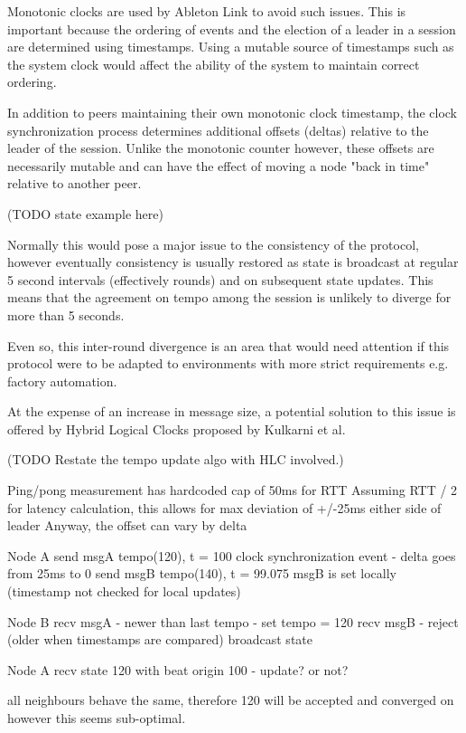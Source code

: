 \documentclass[11pt]{article} %
\theoremstyle{plain}
\theoremstyle{definition}
\begin{document}
Monotonic clocks are used by Ableton Link\cite{goltz2018ableton} to avoid such
issues. This is important because the ordering of events and the election of a
leader in a session are determined using timestamps. Using a mutable source of
timestamps such as the system clock would affect the ability of the system to
maintain correct ordering.

In addition to peers maintaining their own monotonic clock timestamp, the clock
synchronization process determines additional offsets (deltas) relative to the
leader of the session. Unlike the monotonic counter however, these offsets are
necessarily mutable and can have the effect of moving a node "back in time"
relative to another peer.

(TODO state example here)

Normally this would pose a major issue to the consistency of the protocol,
however eventually consistency is usually restored as state is broadcast at
regular 5 second intervals (effectively rounds) and on subsequent state
updates. This means that the agreement on tempo among the session is unlikely
to diverge for more than 5 seconds.

Even so, this inter-round divergence is an area that would need attention if
this protocol were to be adapted to environments with more strict requirements
e.g. factory automation.

At the expense of an increase in message size, a potential solution to this
issue is offered by Hybrid Logical Clocks\cite{kulkarni2014logical} proposed by
Kulkarni et al.

(TODO Restate the tempo update algo with HLC involved.)

Ping/pong measurement has hardcoded cap of 50ms for RTT
Assuming RTT / 2 for latency calculation, this allows for max deviation of +/-25ms either side of leader
Anyway, the offset can vary by delta

Node A
send msgA tempo(120), t = 100
clock synchronization event - delta goes from 25ms to 0
send msgB tempo(140), t = 99.075
msgB is set locally (timestamp not checked for local updates)

Node B
recv msgA - newer than last tempo - set tempo = 120
recv msgB - reject (older when timestamps are compared)
broadcast state

Node A
recv state 120 with beat origin 100 - update? or not?

all neighbours behave the same, therefore 120 will be accepted and converged on however this seems sub-optimal.
\end{document}

